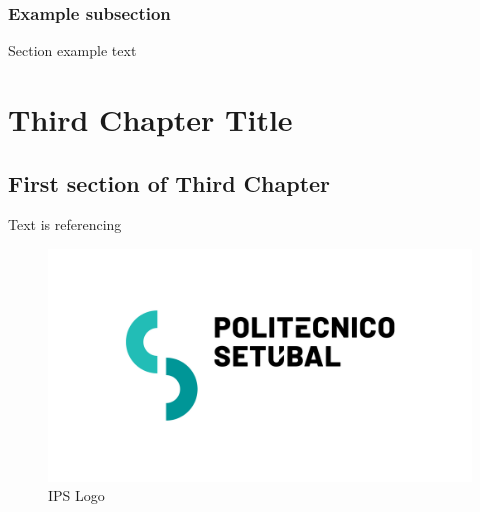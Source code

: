 \documentclass[12pt]{report} %
\begin{document}
\subsection{Example subsection}
Section example text

\newpage
\chapter{Third Chapter Title}
\section{First section of Third Chapter}
Text is referencing 

\begin{figure}[H]
    \centering
    \includegraphics[scale=.25]{images/IPSLogo.png}
    \caption{IPS Logo}
    \label{fig:logo}
\end{figure}

\newpage
\end{document}
